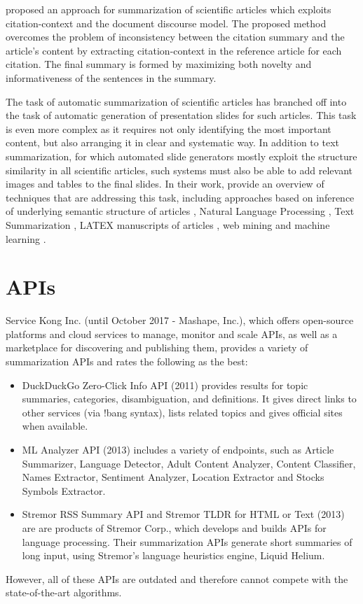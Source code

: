 \documentclass[11pt,a4paper,onecolumn]{article}
\begin{document}
 proposed an approach for summarization of scientific articles which exploits citation-context and the document discourse model.
The proposed method overcomes the problem of inconsistency between the citation summary and the article’s content by extracting citation-context in the reference article for each citation.
The final summary is formed by maximizing both novelty and informativeness of the sentences in the summary.

The task of automatic summarization of scientific articles has branched off into the task of automatic generation of presentation slides for such articles.
This task is even more complex as it requires not only identifying the most important content, but also arranging it in clear and systematic way.
In addition to text summarization, for which automated slide generators mostly exploit the structure similarity in all scientific articles, such systems must also be able to add relevant images and tables to the final slides.
In their work,  provide an overview of techniques that are addressing this task, including approaches based on inference of underlying semantic structure of articles \cite{masao1999automatic}, Natural Language Processing \cite{shibata2005automatic, prasad2009document}, Text Summarization \cite{sarikieffective}, LATEX manuscripts of articles \cite{yasumura2003support, sravanthi2009slidesgen}, web mining \cite{al2005auto, masum2006making} and  machine learning \cite{hu2013ppsgen}.

\section{APIs}
Service Kong Inc. (until October 2017 - Mashape, Inc.), which offers open-source platforms and cloud services to manage, monitor and scale APIs, as well as a marketplace for discovering and publishing them, provides a variety of summarization APIs and rates the following as the best:
\begin{itemize}
\item DuckDuckGo Zero-Click Info API (2011) provides results for topic summaries, categories, disambiguation, and definitions. It gives direct links to other services (via !bang syntax), lists related topics and gives official sites when available.
\item ML Analyzer API (2013) includes a variety of endpoints, such as Article Summarizer, Language Detector, Adult Content Analyzer, Content Classifier, Names Extractor, Sentiment Analyzer, Location Extractor and Stocks Symbols Extractor.
\item Stremor RSS Summary API and Stremor TLDR for HTML or Text (2013) are are products of Stremor Corp., which develops and builds APIs for language processing. Their summarization APIs generate short summaries of long input, using Stremor's language heuristics engine, Liquid Helium.
\end{itemize}
However, all of these APIs are outdated and therefore cannot compete with the state-of-the-art algorithms.
\end{document}
